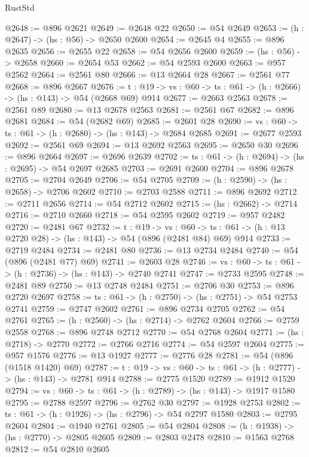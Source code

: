\begin{lexlean}{RustStd}
\begin{coremodule}
@2648 := @896 @2621
@2649 := @2648 @22
@2650 := @54 @2649
@2653 := (h : @2647) -> (hs : @56) -> @2650 @2600
@2654 := @2645 @4
@2655 := @896 @2635
@2656 := @2655 @22
@2658 := @54 @2656 @2600
@2659 := (hs : @56) -> @2658
@2660 := @2654 @53
@2662 := @54 @2593 @2600
@2663 := @957 @2562
@2664 := @2561 @80
@2666 := @13 @2664 @28
@2667 := @2561 @77
@2668 := @896 @2667
@2676 := {t : @19} -> {vs : @60} -> {ts : @61} -> (h : @2666) -> (hs : @143) -> @54 (@2668 @69) @914
@2677 := @2663 @2563
@2678 := @2561 @89
@2680 := @13 @2678 @2563
@2681 := @2561 @67
@2682 := @896 @2681
@2684 := @54 (@2682 @69)
@2685 := @2601 @28
@2690 := {vs : @60} -> {ts : @61} -> (h : @2680) -> (hs : @143) -> @2684 @2685
@2691 := @2677 @2593
@2692 := @2561 @69
@2694 := @13 @2692 @2563
@2695 := @2650 @30
@2696 := @896 @2664
@2697 := @2696 @2639
@2702 := {ts : @61} -> (h : @2694) -> (hs : @2695) -> @54 @2697 @2685
@2703 := @2691 @2600
@2704 := @896 @2678
@2705 := @2704 @2649
@2706 := @54 @2705
@2709 := (h : @2590) -> (hs : @2658) -> @2706 @2602
@2710 := @2703 @2588
@2711 := @896 @2692
@2712 := @2711 @2656
@2714 := @54 @2712 @2602
@2715 := (hs : @2662) -> @2714
@2716 := @2710 @2660
@2718 := @54 @2595 @2602
@2719 := @957 @2482
@2720 := @2481 @67
@2732 := {t : @19} ->
  {vs : @60} -> {ts : @61} -> (h : @13 @2720 @28) -> (hs : @143) -> @54 (@896 (@2481 @84) @69) @914
@2733 := @2719 @2484
@2734 := @2481 @80
@2736 := @13 @2734 @2484
@2740 := @54 (@896 (@2481 @77) @69)
@2741 := @2603 @28
@2746 := {vs : @60} -> {ts : @61} -> (h : @2736) -> (hs : @143) -> @2740 @2741
@2747 := @2733 @2595
@2748 := @2481 @89
@2750 := @13 @2748 @2484
@2751 := @2706 @30
@2753 := @896 @2720 @2697
@2758 := {ts : @61} -> (h : @2750) -> (hs : @2751) -> @54 @2753 @2741
@2759 := @2747 @2602
@2761 := @896 @2734 @2705
@2762 := @54 @2761
@2765 := (h : @2560) -> (hs : @2714) -> @2762 @2604
@2766 := @2759 @2558
@2768 := @896 @2748 @2712
@2770 := @54 @2768 @2604
@2771 := (hs : @2718) -> @2770
@2772 := @2766 @2716
@2774 := @54 @2597 @2604
@2775 := @957 @1576
@2776 := @13 @1927
@2777 := @2776 @28
@2781 := @54 (@896 (@1518 @1420) @69)
@2787 := {t : @19} -> {vs : @60} -> {ts : @61} -> (h : @2777) -> (hs : @143) -> @2781 @914
@2788 := @2775 @1520
@2789 := @1912 @1520
@2794 := {vs : @60} -> {ts : @61} -> (h : @2789) -> (hs : @143) -> @1917 @1580
@2795 := @2788 @2597
@2796 := @2762 @30
@2797 := @1928 @2753
@2802 := {ts : @61} -> (h : @1926) -> (hs : @2796) -> @54 @2797 @1580
@2803 := @2795 @2604
@2804 := @1940 @2761
@2805 := @54 @2804
@2808 := (h : @1938) -> (hs : @2770) -> @2805 @2605
@2809 := @2803 @2478
@2810 := @1563 @2768
@2812 := @54 @2810 @2605

\end{coremodule}
\end{lexlean}
